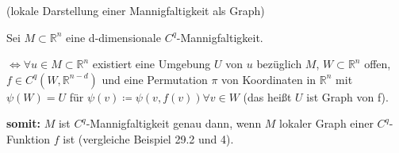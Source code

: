 \begin{sa}

(lokale Darstellung einer Mannigfaltigkeit als Graph)

Sei $M \subset  \mathbb{R}^{n}$ eine d-dimensionale $C^{q}$-Mannigfaltigkeit.

$\Longleftrightarrow \forall u \in M \subset \mathbb{R}^n $ existiert eine Umgebung
$U$ von $u$  bezüglich $M$, $W \subset \mathbb{R}^n $ offen, 
$f \in C^q (W, \mathbb{R}^{n-d})$ und eine Permutation $\pi$ von Koordinaten in
$\mathbb{R}^n $ mit $ \psi (W) = U $ für $ \psi (v) \coloneqq \psi (v, f(v)) 
\forall v \in W $ (das heißt $U$ ist Graph von f).

\textbf{somit:} $M$ ist $C^q$-Mannigfaltigkeit genau dann, wenn $M$ lokaler Graph
einer $C^q$-Funktion $f$ ist (vergleiche Beispiel 29.2 und 4).

\end{sa}

